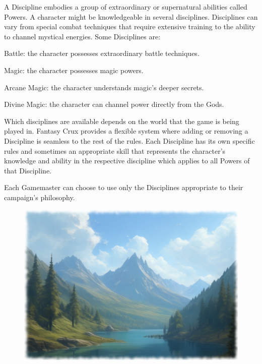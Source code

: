A Discipline embodies a group of extraordinary or supernatural abilities called Powers. A character might be knowledgeable in several disciplines. Disciplines can vary from special combat techniques that require extensive training to the ability to channel mystical energies. Some Disciplines are:
\begin{rpg-list}
\item Battle: the character possesses extraordinary battle techniques.
\item Magic: the character possesses magic powers.
\item Arcane Magic: the character understands magic's deeper secrets.
\item Divine Magic: the character can channel power directly from the Gods.
\end{rpg-list}

Which disciplines are available depends on the world that the game is being played in. Fantasy Crux provides a flexible system where adding or removing a Discipline is seamless to the rest of the rules. Each Discipline has its own specific rules and sometimes an appropriate skill that represents the character's knowledge and ability in the respective discipline which applies to all Powers of that Discipline.

Each Gamemaster can choose to use only the Disciplines appropriate to their campaign's philosophy.


\begin{figure}%
\begin{center}
\includegraphics[scale=0.24]{img/ai-images/lake.png}
\end{center}
\end{figure}

